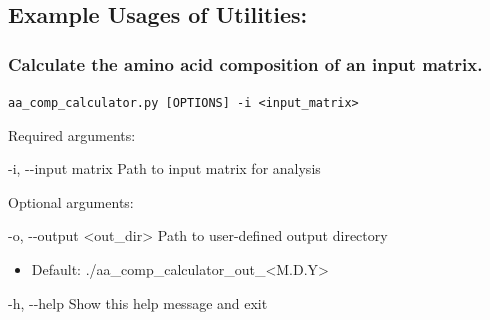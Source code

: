 \documentclass{article}
\def\code#1{\texttt{#1}}
\begin{document}
    \subsection{Example Usages of Utilities:}

        
        \subsubsection{Calculate the amino acid composition of an input matrix.}
        
        \begin{description}
    
            \vspace{0.2cm}
            \item \code{aa\_comp\_calculator.py [OPTIONS] -i <input\_matrix>}
            \vspace{0.2cm}
    
            \begin{description}
                \item Required arguments:
                \begin{description}
                    \item -i, -\/-input matrix \hspace{0.2cm} Path to input matrix for analysis
                \end{description}
            \end{description}
            \vspace{0.2cm}
            \begin{description}
                \item Optional arguments:
                \begin{description}
                    \item -o, -\/-output \hspace{0.2cm} <out\_dir> \hspace{0.2cm} Path to user-defined output directory
                    \begin{itemize}
                        \item Default: ./aa\_comp\_calculator\_out\_<M.D.Y>
                    \end{itemize}
                    \item -h, -\/-help \hspace{0.2cm} Show this help message and exit
                \end{description}
            \end{description}
        

\end{description}
\end{document}
